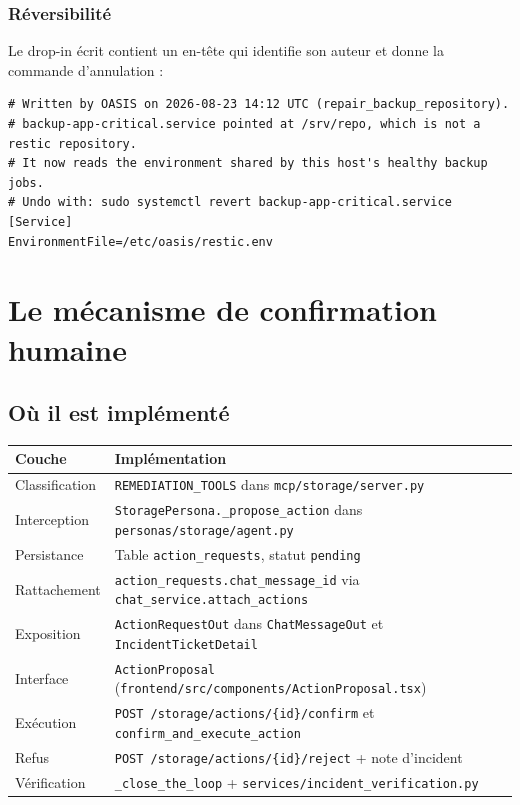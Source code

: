 \documentclass[11pt,a4paper]{report}
\newcommand{\file}[1]{\texttt{\small #1}}
\newcommand{\fn}[1]{\texttt{\small\textcolor{oasisviolet}{#1}}}
\newcommand{\cls}[1]{\texttt{\small\textcolor{oasisblue}{#1}}}
\newcommand{\tbl}[1]{\texttt{\small\textcolor{oasisamber}{#1}}}
\newcommand{\route}[1]{\texttt{\small\textcolor{oasisgreen}{#1}}}
\begin{document}
\subsubsection*{Réversibilité}
Le drop-in écrit contient un en-tête qui identifie son auteur et donne la
commande d'annulation :

\begin{lstlisting}[caption={Contenu du fichier /etc/systemd/system/<service>.d/50-oasis-repair.conf}]
# Written by OASIS on 2026-08-23 14:12 UTC (repair_backup_repository).
# backup-app-critical.service pointed at /srv/repo, which is not a restic repository.
# It now reads the environment shared by this host's healthy backup jobs.
# Undo with: sudo systemctl revert backup-app-critical.service
[Service]
EnvironmentFile=/etc/oasis/restic.env
\end{lstlisting}

\section{Le mécanisme de confirmation humaine}

\subsection{Où il est implémenté}

\begin{longtable}{@{}p{4.4cm}p{10.4cm}@{}}
\toprule
\textbf{Couche} & \textbf{Implémentation}\\
\midrule
\endhead
Classification & \texttt{REMEDIATION\_TOOLS} dans \file{mcp/storage/server.py}\\
Interception & \fn{StoragePersona.\_propose\_action} dans \file{personas/storage/agent.py}\\
Persistance & Table \tbl{action\_requests}, statut \texttt{pending}\\
Rattachement & \tbl{action\_requests.chat\_message\_id} via \fn{chat\_service.attach\_actions}\\
Exposition & \cls{ActionRequestOut} dans \cls{ChatMessageOut} et \cls{IncidentTicketDetail}\\
Interface & \cls{ActionProposal} (\file{frontend/src/components/ActionProposal.tsx})\\
Exécution & \route{POST /storage/actions/\{id\}/confirm} et \fn{confirm\_and\_execute\_action}\\
Refus & \route{POST /storage/actions/\{id\}/reject} + note d'incident\\
Vérification & \fn{\_close\_the\_loop} + \file{services/incident\_verification.py}\\
\bottomrule
\end{longtable}
\end{document}
